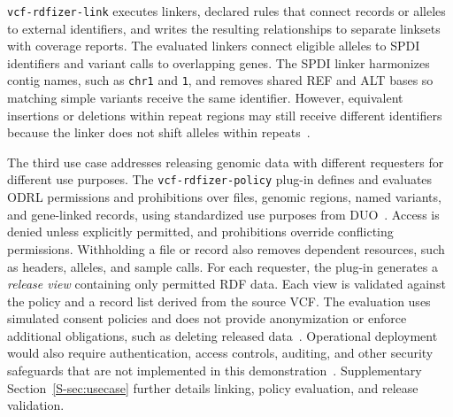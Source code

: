 \documentclass[pdflatex,sn-mathphys-num]{sn-jnl}
\begin{document}
\texttt{vcf-rdfizer-link} executes linkers, declared rules that connect records or alleles to external identifiers, and writes the resulting relationships to separate linksets with coverage reports.
The evaluated linkers connect eligible alleles to SPDI identifiers and variant calls to overlapping genes.
The SPDI linker harmonizes contig names, such as \texttt{chr1} and \texttt{1}, and removes shared REF and ALT bases so matching simple variants receive the same identifier.
However, equivalent insertions or deletions within repeat regions may still receive different identifiers because the linker does not shift alleles within repeats~\cite{holmes2020spdi}.

The third use case addresses releasing genomic data with different requesters for different use purposes.
The \texttt{vcf-rdfizer-policy} plug-in defines and evaluates ODRL permissions and prohibitions over files, genomic regions, named variants, and gene-linked records, using standardized use purposes from DUO~\cite{odrl_2018,lawson2021duo}.
Access is denied unless explicitly permitted, and prohibitions override conflicting permissions.
Withholding a file or record also removes dependent resources, such as headers, alleles, and sample calls.
For each requester, the plug-in generates a \emph{release view} containing only permitted RDF data.
Each view is validated against the policy and a record list derived from the source VCF.
The evaluation uses simulated consent policies and does not provide anonymization or enforce additional obligations, such as deleting released data~\cite{garfinkel2023deidentification}.
Operational deployment would also require authentication, access controls, auditing, and other security safeguards that are not implemented in this demonstration~\cite{ga4gh2019dsip}.
Supplementary Section~\ref{S-sec:usecase} further details linking, policy evaluation, and release validation.
\end{document}
